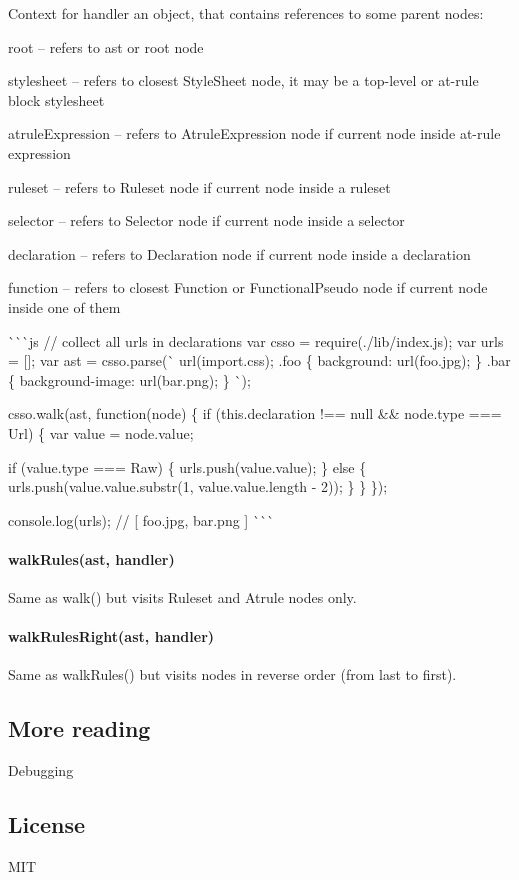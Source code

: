 Context for handler an object, that contains references to some parent nodes\+:


\begin{DoxyItemize}
\item root – refers to {\ttfamily ast} or root node
\item stylesheet – refers to closest {\ttfamily Style\+Sheet} node, it may be a top-\/level or at-\/rule block stylesheet
\item atrule\+Expression – refers to {\ttfamily Atrule\+Expression} node if current node inside at-\/rule expression
\item ruleset – refers to {\ttfamily Ruleset} node if current node inside a ruleset
\item selector – refers to {\ttfamily Selector} node if current node inside a selector
\item declaration – refers to {\ttfamily Declaration} node if current node inside a declaration
\item function – refers to closest {\ttfamily Function} or {\ttfamily Functional\+Pseudo} node if current node inside one of them
\end{DoxyItemize}

\`{}\`{}\`{}js // collect all urls in declarations var csso = require(\textquotesingle{}./lib/index.js\textquotesingle{}); var urls = \mbox{[}\mbox{]}; var ast = csso.\+parse(\`{}  url(import.\+css); .foo \{ background\+: url(\textquotesingle{}foo.\+jpg\textquotesingle{}); \} .bar \{ background-\/image\+: url(bar.\+png); \} \`{});

csso.\+walk(ast, function(node) \{ if (this.\+declaration !== null \&\& node.\+type === \textquotesingle{}Url\textquotesingle{}) \{ var value = node.\+value;

if (value.\+type === \textquotesingle{}Raw\textquotesingle{}) \{ urls.\+push(value.\+value); \} else \{ urls.\+push(value.\+value.\+substr(1, value.\+value.\+length -\/ 2)); \} \} \});

console.\+log(urls); // \mbox{[} \textquotesingle{}foo.\+jpg\textquotesingle{}, \textquotesingle{}bar.\+png\textquotesingle{} \mbox{]} \`{}\`{}\`{}

\paragraph*{walk\+Rules(ast, handler)}

Same as {\ttfamily walk()} but visits {\ttfamily Ruleset} and {\ttfamily Atrule} nodes only.

\paragraph*{walk\+Rules\+Right(ast, handler)}

Same as {\ttfamily walk\+Rules()} but visits nodes in reverse order (from last to first).

\subsection*{More reading}


\begin{DoxyItemize}
\item Debugging
\end{DoxyItemize}

\subsection*{License}

M\+IT 